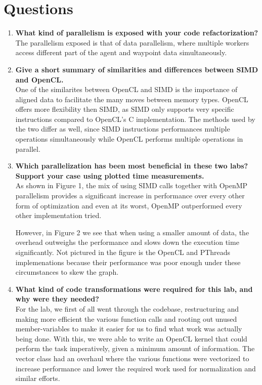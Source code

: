\documentclass[a4paper,11pt]{article}
\begin{document}
\section{Questions}
\begin{enumerate}[label=\Alph*.]
\item \textbf{What kind of parallelism is exposed with your code
  refactorization?}\\ The parallelism exposed is that of data
  parallelism, where multiple workers access different part of the
  agent and waypoint data simultaneously.
  
\item \textbf{Give a short summary of similarities and differences
  between SIMD and OpenCL.}\\ One of the similarites between OpenCL
  and SIMD is the importance of aligned data to facilitate the many
  moves between memory types. OpenCL offers more flexibility then
  SIMD, as SIMD only supports very specific instructions compared to
  OpenCL's C implementation. The methods used by the two differ as
  well, since SIMD instructions performances multiple operations
  simultaneously while OpenCL performs multiple operations in
  parallel.
  
\item \textbf{Which parallelization has been most beneficial in these
  two labs? Support your case using plotted time measurements.}\\ As
  shown in Figure 1, the mix of using SIMD calls together with OpenMP
  parallelism provides a significant increase in performance over
  every other form of optimization and even at its worst, OpenMP
  outperformed every other implementation tried.

  However, in Figure 2 we see that when using a smaller amount of
  data, the overhead outweighs the performance and slows down the
  execution time significantly. Not pictured in the figure is the
  OpenCL and PThreads implemenations because their performance was
  poor enough under these circumstances to skew the graph.

\item \textbf{What kind of code transformations were required for this
  lab, and why were they needed?}\\ For the lab, we first of all went
  through the codebase, restructuring and making more efficient the
  various function calls and rooting out unused member-variables to
  make it easier for us to find what work was actually being
  done. With this, we were able to write an OpenCL kernel that could
  perform the task imperatively, given a minimum amount of
  information. The vector class had an overhaul where the various
  functions were vectorized to increase performance and lower the
  required work used for normalization and similar efforts.


\end{enumerate}
\end{document}
